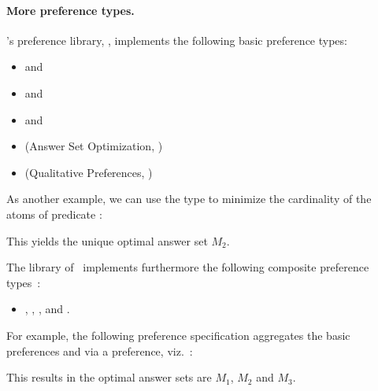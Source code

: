 \paragraph{More preference types.}

\asprin's preference library, , implements the following basic preference types:  
\begin{itemize}
	\item  {} and    
	\item  {} and    
	\item  {} and    
	\item  {}   (Answer Set Optimization, \cite{brnitr03a})   
	\item  {} (Qualitative Preferences, \cite{rogima10a})  
\end{itemize}
As another example, 
we can use the type  to minimize the cardinality of the atoms of predicate : 
%

This yields the unique optimal answer set $M_2$.

The library of \asprin\ implements furthermore the following composite preference types~\cite{sonpon06a}: 
\begin{itemize}
\item \code{and}, \code{not}, \code{lexico}, and .
\end{itemize}

For example, 
the following preference specification 
aggregates the basic preferences  and 
via a \code{pareto} preference, viz.~: 
%

%
This results in the optimal answer sets are $M_1$, $M_2$ and $M_3$.

